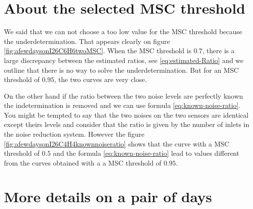 \section{About the selected MSC threshold}
We said that we can not choose a too low value for the MSC threshold because the underdetermination. That appears clearly on figure \ref{fig:afewdaysonI26C6H6twoMSC}.
When the  MSC threshold is $0.7$, there is a large discrepancy between the estimated ratios, see \eqref{eq:estimated-Ratio} and we outline that there is no way to solve the underdetermination. But for an MSC threshold of $0.95$, the two curves are very close.


On the other hand if the ratio between the two noise levels are perfectly known the indetermination is removed and we can use formula \eqref{eq:known-noise-ratio}. You might be tempted to say that the two noises on the two sensors are identical except theirs levels and consider that the ratio is given by the number of inlets in the noise reduction system. However the figure \ref{fig:afewdaysonI26C4H4knownnoiseratio} shows that the curve with a MSC threshold of $0.5$ and the formula \eqref{eq:known-noise-ratio} lead to values different from the curves obtained with a a MSC threshold of $0.95$.





\newpage\clearpage
\section{More details on a pair of days}




